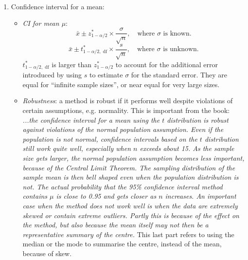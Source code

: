 \begin{enumerate}[label=\textbf{\S~\arabic*}, ref=\S~\arabic*]
\begin{enumerate}[label=\textbf{\S~5.\arabic*}, ref=\S~5.\arabic*]
        \item Confidence interval for a mean:
        \begin{itemize}
            \item \textit{CI for mean $\mu$}: 
            \[
            \bar{x} \pm z^*_{1-\alpha/2} \times \frac{\sigma}{\sqrt{n}} , \quad \text{where $\sigma$ is known.}
            \]
            \[
            \bar{x} \pm t^*_{1-\alpha/2, \text{ df}} \times \frac{s}{\sqrt{n}} , \quad \text{where $\sigma$ is unknown.}
            \]
            $t^*_{1-\alpha/2, \text{ df}}$ is larger than $z^*_{1-\alpha/2}$ to account for the additional error introduced by using $s$ to estimate $\sigma$ for the standard error. They are equal for ``infinite sample sizes'', or near equal for very large sizes.
            \item \textit{Robustness}: a method is robust if it performs well despite violations of certain assumptions, e.g. normality. This is important from the book: \textit{...the confidence interval for a mean using the $t$ distribution is robust against violations of the normal population assumption. Even if the population is not normal, confidence intervals based on the $t$ distribution still work quite well, especially when $n$ exceeds about 15. As the sample size gets larger, the normal population assumption becomes less important, because of the Central Limit Theorem. The sampling distribution of the sample mean is then bell shaped even when the population distribution is not. The actual probability that the 95\% confidence interval method contains $\mu$ is close to 0.95 and gets closer as $n$ increases. \newline An important case when the method does not work well is when the data are extremely skewed or contain extreme outliers. Partly this is because of the effect on the method, but also because the mean itself may not then be a representative summary of the centre.} This last part refers to using the median or the mode to summarise the centre, instead of the mean, because of skew.
        \end{itemize}
        

\end{enumerate}
\end{enumerate}
